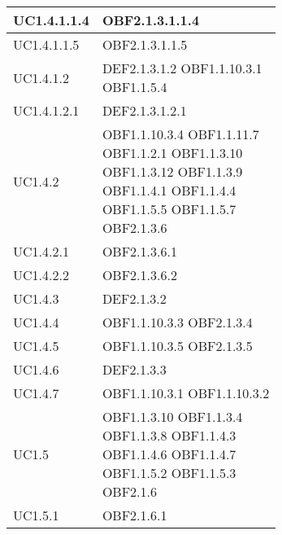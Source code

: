 \documentclass{scalatekids-article}
\begin{document}
\begin{longtable}[H]{|p{5.5cm}|p{5.5cm}|}
  \hline
  UC1.4.1.1.4 & \multiLineCell[t]{OBF2.1.3.1.1.4\\}\\
  \hline
  UC1.4.1.1.5 & \multiLineCell[t]{OBF2.1.3.1.1.5\\}\\
  \hline
  UC1.4.1.2 & \multiLineCell[t]{DEF2.1.3.1.2 OBF1.1.10.3.1\\OBF1.1.5.4\\}\\
  \hline
  UC1.4.1.2.1 & \multiLineCell[t]{DEF2.1.3.1.2.1\\}\\
  \hline
  UC1.4.2 & \multiLineCell[t]{OBF1.1.10.3.4 OBF1.1.11.7\\OBF1.1.2.1 OBF1.1.3.10\\OBF1.1.3.12 OBF1.1.3.9\\OBF1.1.4.1 OBF1.1.4.4\\OBF1.1.5.5 OBF1.1.5.7\\OBF2.1.3.6\\}\\
  \hline
  UC1.4.2.1 & \multiLineCell[t]{OBF2.1.3.6.1\\}\\
  \hline
  UC1.4.2.2 & \multiLineCell[t]{OBF2.1.3.6.2\\}\\
  \hline
  UC1.4.3 & \multiLineCell[t]{DEF2.1.3.2\\}\\
  \hline
  UC1.4.4 & \multiLineCell[t]{OBF1.1.10.3.3 OBF2.1.3.4\\}\\
  \hline
  UC1.4.5 & \multiLineCell[t]{OBF1.1.10.3.5 OBF2.1.3.5\\}\\
  \hline
  UC1.4.6 & \multiLineCell[t]{DEF2.1.3.3\\}\\
  \hline
  UC1.4.7 & \multiLineCell[t]{OBF1.1.10.3.1 OBF1.1.10.3.2\\}\\
  \hline
  UC1.5 & \multiLineCell[t]{OBF1.1.3.10 OBF1.1.3.4\\OBF1.1.3.8 OBF1.1.4.3\\OBF1.1.4.6 OBF1.1.4.7\\OBF1.1.5.2 OBF1.1.5.3\\OBF2.1.6\\}\\
  \hline
  UC1.5.1 & \multiLineCell[t]{OBF2.1.6.1\\}\\

\end{longtable}
\end{document}
